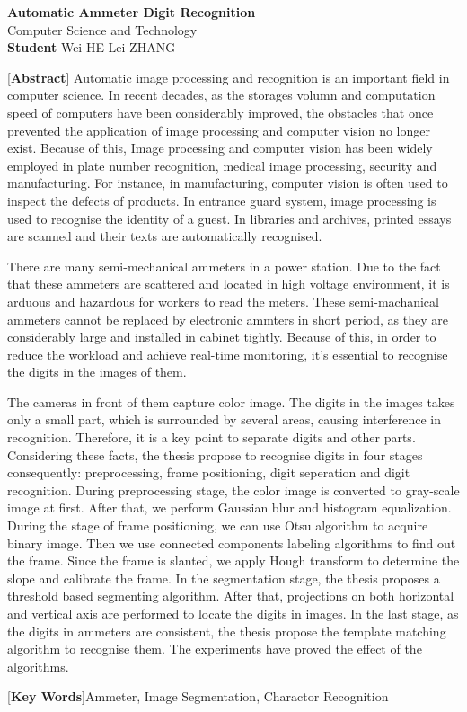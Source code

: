 \begin{center}
\vspace*{12pt}
{\bf{}Automatic Ammeter Digit Recognition}\\[18pt]
Computer Science and Technology\\[12pt]
{\bf Student} \quad Wei HE  \quad Lei ZHANG\\[24pt]
\end{center}\par

{[{\bf Abstract}] Automatic image processing and recognition is an important field in computer science. In recent decades, as the storages volumn and computation speed of computers have been considerably improved, the obstacles that once prevented the application of image processing and computer vision no longer exist. Because of this, Image processing and computer vision has been widely employed in plate number recognition, medical image processing, security and manufacturing. For instance, in manufacturing, computer vision is often used to inspect the defects of products. In entrance guard system, image processing is used to recognise the identity of a guest. In libraries and archives, printed essays are scanned and their texts are automatically recognised.

There are many semi-mechanical ammeters in a power station. Due to the fact that these ammeters are scattered and located in high voltage environment, it is arduous and hazardous for workers to read the meters. These semi-machanical ammeters cannot be replaced by electronic ammters in short period, as they are considerably large and installed in cabinet tightly. Because of this, in order to reduce the workload and achieve real-time monitoring, it's essential to recognise the digits in the images of them.

The cameras in front of them capture color image. The digits in the images takes only a small part, which is surrounded by several areas, causing interference in recognition. Therefore, it is a key point to separate digits and other parts. Considering these facts, the thesis propose to recognise digits in four stages consequently: preprocessing, frame positioning, digit seperation and digit recognition. During preprocessing stage, the color image is converted to gray-scale image at first. After that, we perform Gaussian blur and histogram equalization. During the stage of frame positioning, we can use Otsu algorithm to acquire binary image. Then we use connected components labeling algorithms to find out the frame. Since the frame is slanted, we apply Hough transform to determine the slope and calibrate the frame. In the segmentation stage, the thesis proposes a threshold based segmenting algorithm. After that, projections on both horizontal and vertical axis are performed to locate the digits in images. In the last stage, as the digits in ammeters are consistent, the thesis propose the template matching algorithm to recognise them. The experiments have proved the effect of the algorithms.
}

\vspace{10pt}

[{\bf Key Words}]{Ammeter, Image Segmentation, Charactor Recognition}


